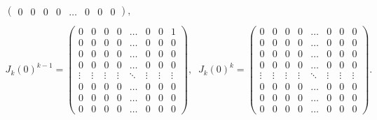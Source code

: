 \begin{algorithm}
\begin{eqnarray*}
\begin{pmatrix}
            0       & 0       & 0       & 0       & \dots  & 0       & 0       & 0
        \end{pmatrix}, \\ \\ J_k(0)^{k-1} = \begin{pmatrix}
            0       & 0       & 0       & 0       & \dots  & 0       & 0       & 1          \\
            0       & 0       & 0       & 0       & \dots  & 0       & 0       & 0          \\
            0       & 0       & 0       & 0       & \dots  & 0       & 0       & 0          \\
            0       & 0       & 0       & 0       & \dots  & 0       & 0       & 0          \\
            \vdots  & \vdots  & \vdots  & \vdots  & \ddots & \vdots  & \vdots  & \vdots     \\
            0       & 0       & 0       & 0       & \dots  & 0       & 0       & 0          \\
            0       & 0       & 0       & 0       & \dots  & 0       & 0       & 0          \\
            0       & 0       & 0       & 0       & \dots  & 0       & 0       & 0
        \end{pmatrix}, \; \;  J_k(0)^k = \begin{pmatrix}
            0       & 0       & 0       & 0       & \dots  & 0       & 0       & 0          \\
            0       & 0       & 0       & 0       & \dots  & 0       & 0       & 0          \\
            0       & 0       & 0       & 0       & \dots  & 0       & 0       & 0          \\
            0       & 0       & 0       & 0       & \dots  & 0       & 0       & 0          \\
            \vdots  & \vdots  & \vdots  & \vdots  & \ddots & \vdots  & \vdots  & \vdots     \\
            0       & 0       & 0       & 0       & \dots  & 0       & 0       & 0          \\
            0       & 0       & 0       & 0       & \dots  & 0       & 0       & 0          \\
            0       & 0       & 0       & 0       & \dots  & 0       & 0       & 0
        \end{pmatrix}.
    \end{eqnarray*}


\end{algorithm}
